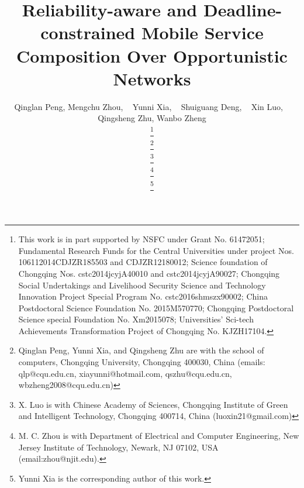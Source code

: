 \documentclass[journal]{IEEEtran}
\begin{document}
\title{Reliability-aware and Deadline-constrained Mobile Service Composition Over Opportunistic Networks}

\author{Qinglan Peng,
        Mengchu Zhou, ~
        Yunni Xia, ~
        Shuiguang Deng, ~
        Xin Luo, ~
        Qingsheng Zhu,
        Wanbo Zheng


\thanks{This work is in part supported by NSFC under Grant No. 61472051; Fundamental Research Funds for the Central Universities under project Nos. 106112014CDJZR185503 and CDJZR12180012; Science foundation of
Chongqing Nos. cstc2014jcyjA40010 and cstc2014jcyjA90027; Chongqing Social Undertakings and Livelihood Security Science and Technology Innovation Project Special Program No. cstc2016shmszx90002; China Postdoctoral Science Foundation No. 2015M570770; Chongqing Postdoctoral Science special Foundation No. Xm2015078; Universities’ Sci-tech Achievements Transformation Project of Chongqing No. KJZH17104.}

\thanks{Qinglan Peng, Yunni Xia, and Qingsheng Zhu are with the school of computers, Chongqing University, Chongqing 400030, China (emails: qlp@cqu.edu.cn, xiayunni@hotmail.com, qszhu@cqu.edu.cn, wbzheng2008@cqu.edu.cn)}

\thanks{X. Luo is with Chinese Academy of Sciences, Chongqing Institute of Green and Intelligent
Technology, Chongqing 400714, China (luoxin21@gmail.com)}

\thanks{M. C. Zhou is with Department of Electrical and Computer Engineering, New Jersey Institute of Technology, Newark, NJ 07102, USA (email:zhou@njit.edu).}

\thanks{Yunni Xia is the corresponding author of this work.}
}




\maketitle
\end{document}
